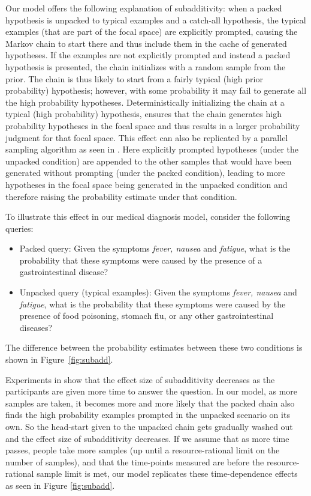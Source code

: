 Our model offers the following explanation of subadditivity: when a packed hypothesis is unpacked to typical examples and a catch-all hypothesis, the typical examples (that are part of the focal space) are explicitly prompted, causing the Markov chain to start there and thus include them in the cache of generated hypotheses.
If the examples are not explicitly prompted and instead a packed hypothesis is presented, the chain initializes with a random sample from the prior. The chain is thus likely to start from a fairly typical (high prior probability) hypothesis; however, with some probability it may fail to generate all the high probability hypotheses. Deterministically initializing the chain at a typical (high probability) hypothesis, ensures that the chain generates high probability hypotheses in the focal space and thus results in a larger probability judgment for that focal space.
This effect can also be replicated by a parallel sampling algorithm as seen in \cite{Thomas2008}. Here explicitly prompted hypotheses (under the unpacked condition) are appended to the other samples that would have been generated without prompting (under the packed condition), leading to more hypotheses in the focal space being generated in the unpacked condition and therefore raising the probability estimate under that condition.

To illustrate this effect in our medical diagnosis model, consider the following queries: 
\begin{itemize}
\item Packed query: Given the symptoms \emph{fever, nausea} and \emph{fatigue}, what is the probability that these symptoms were caused by the presence of a gastrointestinal disease? 
\item Unpacked query (typical examples): Given the symptoms \emph{fever, nausea} and \emph{fatigue}, what is the probability that these symptoms were caused by the presence of food poisoning, stomach flu, or any other gastrointestinal diseases?
\end{itemize}
The difference between the probability estimates between these two conditions is shown in Figure~\ref{fig:subadd}.

Experiments in \cite{Dougherty2003} show that the effect size of subadditivity decreases as the participants are given more time to answer the question. In our model, as more samples are taken, it becomes more and more likely that the packed chain also finds the high probability examples prompted in the unpacked scenario on its own. So the head-start given to the unpacked chain gets gradually washed out and the effect size of subadditivity decreases. If we assume that as more time passes, people take more samples (up until a resource-rational limit on the number of samples), and that the time-points measured are before the resource-rational sample limit is met, our model replicates these time-dependence effects as seen in Figure \ref{fig:subadd}.

